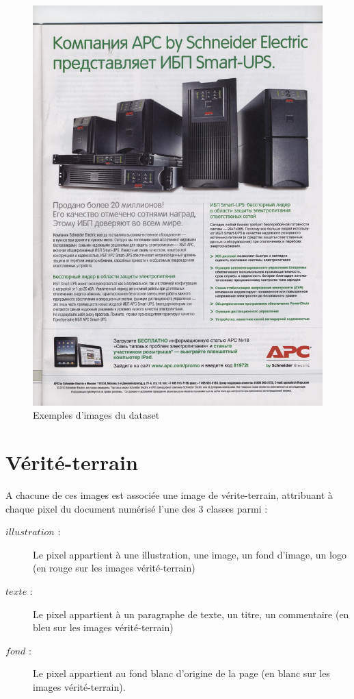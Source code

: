 \documentclass{book}
\begin{document}
\begin{figure}[H]
\begin{center}
\includegraphics[scale=0.2]{images/6.jpg}
\end{center}
\caption{Exemples d'images du dataset}
\label{exemple}
\end{figure}
\clearpage

\section{Vérité-terrain}
A chacune de ces images est associée une image de vérite-terrain, attribuant à chaque pixel du document numérisé l'une des 3 classes parmi : \\
\begin{description} %

\item[$illustration$ :] Le pixel appartient à une illustration, une image, un fond d'image, un logo (en rouge sur les images vérité-terrain)
\item[$texte$ :] Le pixel appartient à un paragraphe de texte, un titre, un commentaire (en bleu sur les images vérité-terrain)
\item[$fond$ :] Le pixel appartient au fond blanc d'origine de la page (en blanc sur les images vérité-terrain).

\end{description}
\end{document}
